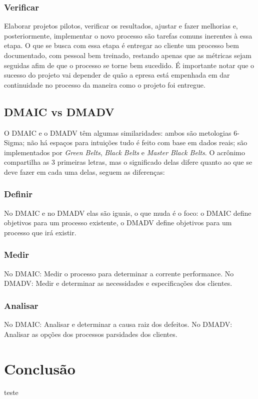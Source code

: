 \documentclass{abnt}
\begin{document}
				\subsection {Verificar}
				Elaborar projetos pilotos, verificar os resultados, ajustar e fazer melhorias
				e, posteriormente, implementar o novo processo são tarefas comuns inerentes à essa etapa. O que se busca 
				com essa etapa é entregar ao cliente um processo bem documentado, com pessoal bem treinado, restando apenas 
				que as métricas sejam seguidas afim de que o processo se torne bem sucedido. 
				É importante notar que o sucesso do projeto vai depender de quão a epresa está empenhada em dar continuidade 
				no processo da maneira como o projeto foi entregue.
			\section {DMAIC vs DMADV}
				O DMAIC e o DMADV têm algumas similaridades: ambos são metologias 6-Sigma; não há espaços para intuições 
				tudo é feito com base em dados reais; são implementados por \textit{Green Belts}, \textit{Black Belts} e \textit{Master Black Belts}.
				O acrônimo compartilha as 3 primeiras letras, mas o significado delas difere quanto ao que se deve fazer em cada uma delas, 
				seguem as diferenças:
				\subsection {Definir}
				No DMAIC e no DMADV elas são iguais, o que muda é o foco: o DMAIC define objetivos para um processo existente, 
				o DMADV define objetivos para um processo que irá existir.
				\subsection {Medir}
				No DMAIC: Medir o processo para determinar a corrente performance.
				No DMADV: Medir e determinar as necessidades e especificações dos clientes.
				\subsection {Analisar}
				No DMAIC: Analisar e determinar a causa raiz dos defeitos. 
				No DMADV: Analisar as opções dos processos parsidades dos clientes.
	
	\chapter {Conclusão}
	
	\begin{thebibliography}{99}
		 teste
	\end{thebibliography}
\end{document}
